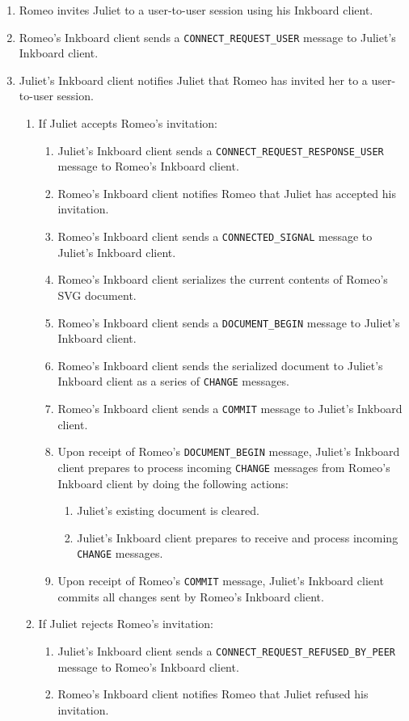 \documentclass[11pt]{article}
\begin{document}
\begin{enumerate}
\item Romeo invites Juliet to a user-to-user session using his Inkboard client. 
\item Romeo's Inkboard client sends a \texttt{CONNECT\_REQUEST\_USER} message to Juliet's Inkboard client.
\item Juliet's Inkboard client notifies Juliet that Romeo has invited her to a user-to-user session.
\begin{enumerate}
\item If Juliet accepts Romeo's invitation:
\begin{enumerate}
\item Juliet's Inkboard client sends a \texttt{CONNECT\_REQUEST\_RESPONSE\_USER} message to Romeo's Inkboard client.
\item Romeo's Inkboard client notifies Romeo that Juliet has accepted his invitation.
\item Romeo's Inkboard client sends a \texttt{CONNECTED\_SIGNAL} message to Juliet's Inkboard client.
\item Romeo's Inkboard client serializes the current contents of Romeo's SVG document.
\item Romeo's Inkboard client sends a \texttt{DOCUMENT\_BEGIN} message to Juliet's Inkboard client.
\item Romeo's Inkboard client sends the serialized document to Juliet's Inkboard client as a series of \texttt{CHANGE} messages.
\item Romeo's Inkboard client sends a \texttt{COMMIT} message to Juliet's Inkboard client.
\item Upon receipt of Romeo's \texttt{DOCUMENT\_BEGIN} message, Juliet's Inkboard client prepares to process incoming \texttt{CHANGE} messages from Romeo's Inkboard client by doing the following actions:
\begin{enumerate}
\item Juliet's existing document is cleared.
\item Juliet's Inkboard client prepares to receive and process incoming \texttt{CHANGE} messages.
\end{enumerate}
\item Upon receipt of Romeo's \texttt{COMMIT} message, Juliet's Inkboard client commits all changes sent by Romeo's Inkboard client.
\end{enumerate}
\item If Juliet rejects Romeo's invitation:
\begin{enumerate}
\item Juliet's Inkboard client sends a \texttt{CONNECT\_REQUEST\_REFUSED\_BY\_PEER} message to Romeo's Inkboard client.
\item Romeo's Inkboard client notifies Romeo that Juliet refused his invitation.
\end{enumerate}
\end{enumerate}
\end{enumerate}
\end{document}
